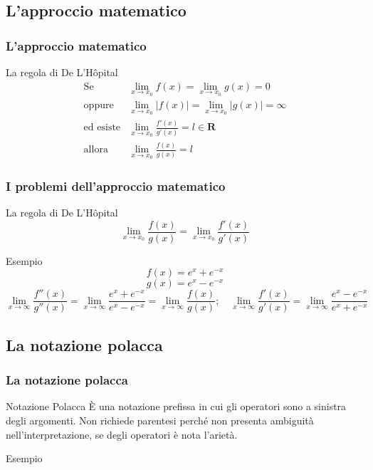 \documentclass[aspectratio=149]{beamer}
\begin{document}
	\subsection{L'approccio matematico}
	\begin{frame}
		\frametitle{L'approccio matematico}
		\begin{block}{La regola di De L'Hôpital}
			\[
			\begin{aligned}
				\text{Se} &\lim_{x \to x_{0}}{f(x)} = \lim_{x \to x_{0}}{g(x)} = 0 \\ \text{oppure} &\lim_{x \to x_{0}}{\lvert f(x) \rvert} = \lim_{x \to x_{0}}{\lvert g(x) \rvert} = \infty \\ \text{ed esiste} &\lim_{x \to x_{0}}{\frac{f'(x)}{g'(x)}} = l \in \mathbf{R} \\ \text{allora} &\lim_{x \to x_{0}}{\frac{f(x)}{g(x)}} = l
			\end{aligned}
			\]
		\end{block}
	\end{frame}

	\begin{frame}
		\frametitle{I problemi dell'approccio matematico}
		\begin{block}{La regola di De L'Hôpital}
			\[
			\lim_{x \to x_{0}}{\frac{f(x)}{g(x)}} = \lim_{x \to x_{0}}{\frac{f'(x)}{g'(x)}}
			\]
		\end{block}
		\begin{alertblock}{Esempio}
			\[
			f(x) = e^{x} + e^{-x}
			\] 
			\[
			g(x) = e^{x} - e^{-x}
			\]	
			\[
			\lim_{x \to \infty}{\frac{f''(x)}{g''(x)}} = \lim_{x \to \infty}{\frac{e^{x} + e^{-x}}{e^{x} - e^{-x}}} = \lim_{x \to \infty}{\frac{f(x)}{g(x)}}; \quad \lim_{x \to \infty}{\frac{f'(x)}{g'(x)}} = \lim_{x \to \infty}{\frac{e^{x} - e^{-x}}{e^{x} + e^{-x}}}
			\]
		\end{alertblock}
	\end{frame}

	\subsection{La notazione polacca}
	\begin{frame}
		\frametitle{La notazione polacca}
		\begin{block}{Notazione Polacca}
			È una notazione prefissa in cui gli operatori sono a sinistra degli argomenti. Non richiede parentesi perché non presenta ambiguità nell'interpretazione, se degli operatori è nota l'arietà.
		\end{block}
		\begin{exampleblock}{Esempio}
			\onslide<2->{\[
				3 \times (4 - 5) \rightarrow \times \: 3 - 4 \: 5
			\]}
			\onslide<3->{\[
				\lim_{\textcolor{red}{x} \to \textcolor{blue}{0}}{\frac{\textcolor{orange}{e^{x} - 1}}{x}} \rightarrow \text{lim} \: / \textcolor{orange}{- \text{exp} \: x \: 1} \: x \: \textcolor{red}{x} \: \textcolor{blue}{0}
			\]}
		\end{exampleblock}
	\end{frame}
	
\end{document}

